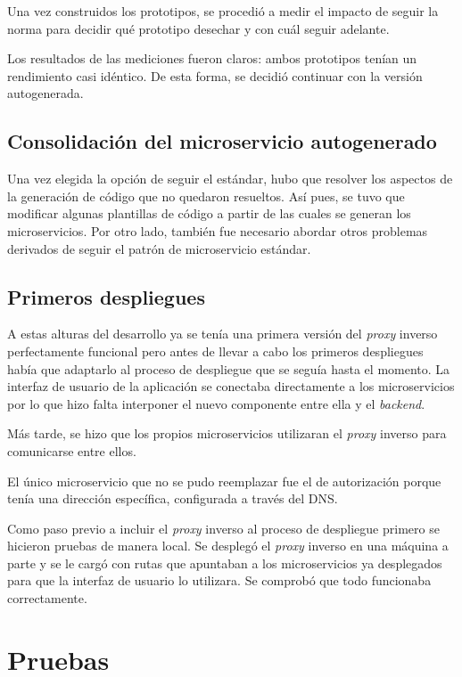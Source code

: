 \documentclass[11pt,spanish,listoffigures]{tfgetsinf}
\begin{document}
Una vez construidos los prototipos, se procedió a medir el impacto de seguir la norma para decidir qué prototipo desechar y con cuál seguir adelante.

Los resultados de las mediciones fueron claros: ambos prototipos tenían un rendimiento casi idéntico. De esta forma, se decidió continuar con la versión autogenerada.

\subsection{Consolidación del microservicio autogenerado}

Una vez elegida la opción de seguir el estándar, hubo que resolver los aspectos de la generación de código que no quedaron resueltos. Así pues, se tuvo que modificar algunas plantillas de código a partir de las cuales se generan los microservicios. Por otro lado, también fue necesario abordar otros problemas derivados de seguir el patrón de microservicio estándar.

\subsection{Primeros despliegues}

A estas alturas del desarrollo ya se tenía una primera versión del \emph{proxy} inverso perfectamente funcional pero antes de llevar a cabo los primeros despliegues había que adaptarlo al proceso de despliegue que se seguía hasta el momento. La interfaz de usuario de la aplicación se conectaba directamente a los microservicios por lo que hizo falta interponer el nuevo componente entre ella y el \emph{backend}.

Más tarde, se hizo que los propios microservicios utilizaran el \emph{proxy} inverso para comunicarse entre ellos.

El único microservicio que no se pudo reemplazar fue el de autorización porque tenía una dirección específica, configurada a través del DNS.

Como paso previo a incluir el \emph{proxy} inverso al proceso de despliegue primero se hicieron pruebas de manera local. Se desplegó el \emph{proxy} inverso en una máquina a parte y se le cargó con rutas que apuntaban a los microservicios ya desplegados para que la interfaz de usuario lo utilizara. Se comprobó que todo funcionaba correctamente.


\section{Pruebas}
\end{document}
